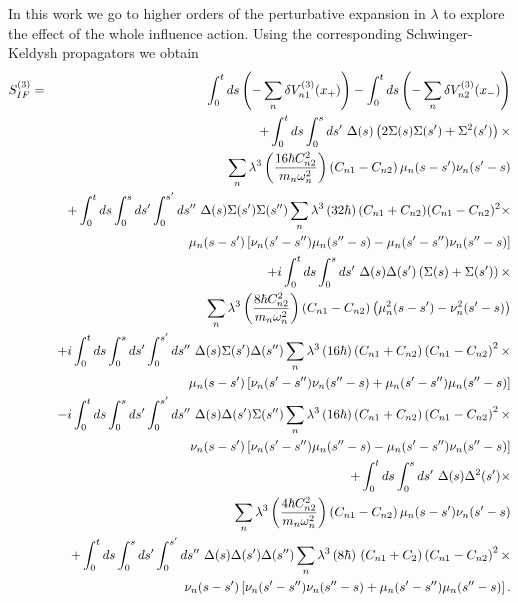 \documentclass[%
amssymb,preprint,preprintnumbers,nofootinbib,superscriptaddress]{revtex4}
\begin{document}
In this work we go to higher orders of the perturbative expansion in $\lambda$ to explore the effect of the whole influence action. Using the corresponding Schwinger-Keldysh propagators we obtain
\begin{eqnarray}
S_{IF}^{(3)}
&=&\int_{0}^{t}ds\left(-\sum_{n}\delta V_{n1}^{(3)}(x_{+})\right)-\int_{0}^{t}ds\left(-\sum_{n}\delta V_{n2}^{(3)}(x_{-})\right)\nonumber\\
&&+\int_{0}^{t}ds\int_{0}^{s}ds'\ \Delta(s)\left(2\Sigma(s)\Sigma(s')+\Sigma^{2}(s')\right)\times\nonumber\\
&&\ \ \ \ \ \sum_{n}\lambda^{3}\left(\frac{16\hbar C_{n2}^{2}}{m_{n}\omega_{n}^{2}}\right)\left(C_{n1}-C_{n2}\right)\mu_{n}(s-s')\nu_{n}(s'-s)\nonumber\\
&&+\int_{0}^{t}ds\int_{0}^{s}ds'\int_{0}^{s'}ds''\
\Delta(s)\Sigma(s')\Sigma(s'')\sum_{n}\lambda^{3}\,(32\hbar)\,(C_{n1}+C_{n2})(C_{n1}-C_{n2})^{2}\times\nonumber\\
&&\hskip 50pt
\mu_{n}(s-s')\left[\nu_{n}(s'-s'')\mu_{n}(s''-s)
-\mu_{n}(s'-s'')\nu_{n}(s''-s)\right]\nonumber\\
&&+i\int_{0}^{t}ds\int_{0}^{s}ds'\ \Delta(s)\Delta(s')\left(\Sigma(s)+\Sigma(s')\right)\times\nonumber\\
&&\ \ \ \ \ \sum_{n}\lambda^{3}\left(\frac{8\hbar C_{n2}^{2}}{m_{n}\omega_{n}^{2}}\right)\left(C_{n1}-C_{n2}\right)\left(\mu_{n}^{2}(s-s')-\nu_{n}^{2}(s'-s)\right)\nonumber\\
&&+i\int_{0}^{t}ds\int_{0}^{s}ds'\int_{0}^{s'}ds''\
\Delta(s)\Sigma(s')\Delta(s'')\sum_{n}\lambda^{3}\,(16\hbar)\left(C_{n1}+C_{n2}\right)\left(C_{n1}-C_{n2}\right)^{2}\times\nonumber\\
&&\hskip 50pt
\mu_{n}(s-s')\left[\nu_{n}(s'-s'')\nu_{n}(s''-s)
+\mu_{n}(s'-s'')\mu_{n}(s''-s)\right]\nonumber\\
&&-i\int_{0}^{t}ds\int_{0}^{s}ds'\int_{0}^{s'}ds''\
\Delta(s)\Delta(s')\Sigma(s'')\sum_{n}\lambda^{3}\,(16\hbar)\left(C_{n1}+C_{n2}\right)\left(C_{n1}-C_{n2}\right)^{2}\times\nonumber\\
&&\hskip 50pt
\nu_{n}(s-s')\left[\nu_{n}(s'-s'')\mu_{n}(s''-s)
-\mu_{n}(s'-s'')\nu_{n}(s''-s)\right]\nonumber\\
&&+\int_{0}^{t}ds\int_{0}^{s}ds'\ \Delta(s)\Delta^{2}(s')\times\nonumber\\
&&\ \ \ \ \ \sum_{n}\lambda^{3}\left(\frac{4\hbar C_{n2}^{2}}{m_{n}\omega_{n}^{2}}\right)\left(C_{n1}-C_{n2}\right)\mu_{n}(s-s')\nu_{n}(s'-s)\nonumber\\
&&+\int_{0}^{t}ds\int_{0}^{s}ds'\int_{0}^{s'}ds''\
\Delta(s)\Delta(s')\Delta(s'')\sum_{n}\lambda^{3}\,(8\hbar)\,\left(C_{n1}+C_{2}\right)\left(C_{n1}-C_{n2}\right)^{2}\times\nonumber\\
&&\hskip 50pt
\nu_{n}(s-s')\left[\nu_{n}(s'-s'')\nu_{n}(s''-s)
+\mu_{n}(s'-s'')\mu_{n}(s''-s)\right].\label{deltaa2}
\end{eqnarray}
\end{document}
